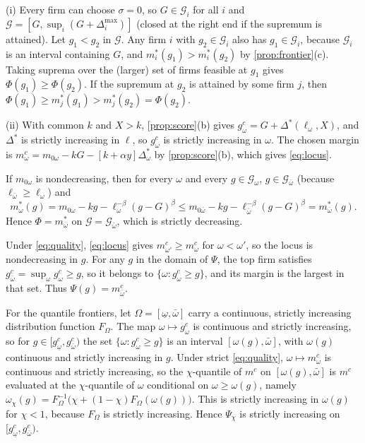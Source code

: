 (i) Every firm can choose $\sigma=0$, so $G\in\mathcal G_i$ for all $i$ and $\mathcal G=[G,\sup_i(G+\Delta_i^{\max})]$ (closed at the right end if the supremum is attained). Let $g_1<g_2$ in $\mathcal G$. Any firm $i$ with $g_2\in\mathcal G_i$ also has $g_1\in\mathcal G_i$, because $\mathcal G_i$ is an interval containing $G$, and $m_i^*(g_1)>m_i^*(g_2)$ by \autoref{prop:frontier}(c). Taking suprema over the (larger) set of firms feasible at $g_1$ gives $\Phi(g_1)\ge\Phi(g_2)$. If the supremum at $g_2$ is attained by some firm $j$, then $\Phi(g_1)\ge m_j^*(g_1)>m_j^*(g_2)=\Phi(g_2)$.

(ii) With common $k$ and $X>k$, \autoref{prop:score}(b) gives $g_\omega^c=G+\Delta^*(\ell_\omega,X)$, and $\Delta^*$ is strictly increasing in $\ell$, so $g_\omega^c$ is strictly increasing in $\omega$. The chosen margin is $m_\omega^c=m_{0\omega}-kG-[k+\alpha y]\Delta_\omega^*$ by \autoref{prop:score}(b), which gives \eqref{eq:locus}.

If $m_{0\omega}$ is nondecreasing, then for every $\omega$ and every $g\in\mathcal G_\omega$, $g\in\mathcal G_{\bar\omega}$ (because $\ell_{\bar\omega}\ge\ell_\omega$) and
\[
m_\omega^*(g)=m_{0\omega}-kg-\ell_\omega^{-\beta}(g-G)^{\beta}\le m_{0\bar\omega}-kg-\ell_{\bar\omega}^{-\beta}(g-G)^{\beta}=m_{\bar\omega}^*(g).
\]
Hence $\Phi=m_{\bar\omega}^*$ on $\mathcal G=\mathcal G_{\bar\omega}$, which is strictly decreasing.

Under \eqref{eq:quality}, \eqref{eq:locus} gives $m_{\omega'}^c\ge m_\omega^c$ for $\omega<\omega'$, so the locus is nondecreasing in $g$. For any $g$ in the domain of $\Psi$, the top firm satisfies $g_{\bar\omega}^c=\sup_\omega g_\omega^c\ge g$, so it belongs to $\{\omega:g_\omega^c\ge g\}$, and its margin is the largest in that set. Thus $\Psi(g)=m_{\bar\omega}^c$.

For the quantile frontiers, let $\Omega=[\underline\omega,\bar\omega]$ carry a continuous, strictly increasing distribution function $F_\Omega$. The map $\omega\mapsto g_\omega^c$ is continuous and strictly increasing, so for $g\in[g_{\underline\omega}^c,g_{\bar\omega}^c)$ the set $\{\omega:g_\omega^c\ge g\}$ is an interval $[\omega(g),\bar\omega]$, with $\omega(g)$ continuous and strictly increasing in $g$. Under strict \eqref{eq:quality}, $\omega\mapsto m_\omega^c$ is continuous and strictly increasing, so the $\chi$-quantile of $m^c$ on $[\omega(g),\bar\omega]$ is $m^c$ evaluated at the $\chi$-quantile of $\omega$ conditional on $\omega\ge\omega(g)$, namely $\omega_\chi(g)=F_\Omega^{-1}\bigl(\chi+(1-\chi)F_\Omega(\omega(g))\bigr)$. This is strictly increasing in $\omega(g)$ for $\chi<1$, because $F_\Omega$ is strictly increasing. Hence $\Psi_\chi$ is strictly increasing on $[g_{\underline\omega}^c,g_{\bar\omega}^c)$.

